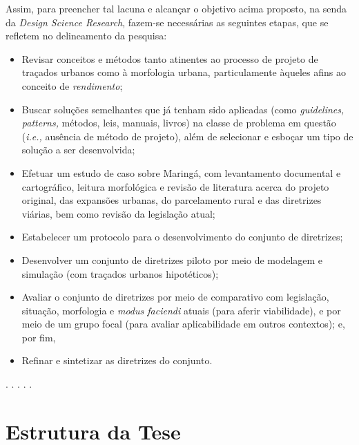 \documentclass[12pt, a4paper]{book} %
\begin{document}
        Assim, para preencher tal lacuna e alcançar o objetivo acima proposto, na senda da \textit{Design Science Research}, fazem-se necessárias as seguintes etapas, que se refletem no delineamento da pesquisa: 
            \begin{itemize}
                \item Revisar conceitos e métodos tanto atinentes ao processo de projeto de traçados urbanos como à morfologia urbana, particulamente àqueles afins ao conceito de \textit{rendimento}; 
                \item Buscar soluções semelhantes que já tenham sido aplicadas (como \textit{guidelines, patterns,} métodos, leis, manuais, livros) na classe de problema em questão (\textit{i.e.,} ausência de método de projeto), além de selecionar e esboçar um tipo de solução a ser desenvolvida;
                \item Efetuar um estudo de caso sobre Maringá, com levantamento documental e cartográfico, leitura morfológica e revisão de literatura acerca do projeto original, das expansões urbanas, do parcelamento rural e das diretrizes viárias, bem como revisão da legislação atual; %
                \item Estabelecer um protocolo para o desenvolvimento do conjunto de diretrizes; 
                \item Desenvolver um conjunto de diretrizes piloto por meio de modelagem e simulação (com traçados urbanos hipotéticos); 
                \item Avaliar o conjunto de diretrizes por meio de comparativo com legislação, situação, morfologia e \textit{modus faciendi} atuais (para aferir viabilidade), e por meio de um grupo focal (para avaliar aplicabilidade em outros contextos); e, por fim,
                \item Refinar e sintetizar as diretrizes do conjunto.
            \end{itemize}

        \begin{center}
        . . . . .
        \end{center}

            \section*{Estrutura da Tese}
\end{document}
